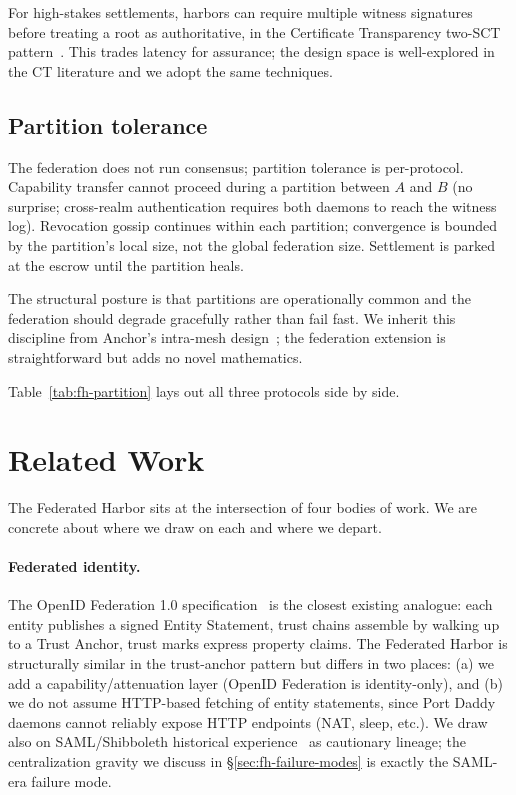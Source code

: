 \documentclass[11pt,a4paper]{article}
\theoremstyle{definition}
\theoremstyle{remark}
\begin{document}
For high-stakes settlements, harbors can require multiple witness signatures before treating a root as authoritative, in the Certificate Transparency two-SCT pattern~. This trades latency for assurance; the design space is well-explored in the CT literature and we adopt the same techniques.

\subsection{Partition tolerance}\label{sec:fh-partition}

The federation does not run consensus; partition tolerance is per-protocol. Capability transfer cannot proceed during a partition between $A$ and $B$ (no surprise; cross-realm authentication requires both daemons to reach the witness log). Revocation gossip continues within each partition; convergence is bounded by the partition's local size, not the global federation size. Settlement is parked at the escrow until the partition heals.

The structural posture is that partitions are operationally common and the federation should degrade gracefully rather than fail fast. We inherit this discipline from Anchor's intra-mesh design~; the federation extension is straightforward but adds no novel mathematics.

Table~\ref{tab:fh-partition} lays out all three protocols side by side.



\section{Related Work}\label{sec:fh-related}

The Federated Harbor sits at the intersection of four bodies of work. We are concrete about where we draw on each and where we depart.

\paragraph{Federated identity.} The OpenID Federation 1.0 specification~ is the closest existing analogue: each entity publishes a signed Entity Statement, trust chains assemble by walking up to a Trust Anchor, trust marks express property claims. The Federated Harbor is structurally similar in the trust-anchor pattern but differs in two places: (a) we add a capability/attenuation layer (OpenID Federation is identity-only), and (b) we do not assume HTTP-based fetching of entity statements, since Port Daddy daemons cannot reliably expose HTTP endpoints (NAT, sleep, etc.). We draw also on SAML/Shibboleth historical experience~ as cautionary lineage; the centralization gravity we discuss in \S\ref{sec:fh-failure-modes} is exactly the SAML-era failure mode.
\end{document}

